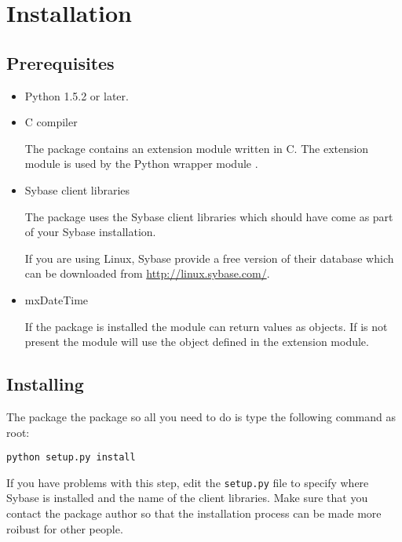 \section{Installation}

\subsection{Prerequisites}

\begin{itemize}
\item Python 1.5.2 or later.

\item C compiler

The  package contains an extension module written in C.
The extension module is used by the Python wrapper module
.

\item Sybase client libraries

The  package uses the Sybase client libraries which
should have come as part of your Sybase installation.

If you are using Linux, Sybase provide a free version of their
database which can be downloaded from \url{http://linux.sybase.com/}.

\item mxDateTime

If the  package is installed the 
module can return  values as  objects.
If  is not present the module will use the
 object defined in the  extension
module.
\end{itemize}
\subsection{Installing}

The  package the  package so all you
need to do is type the following command as root:

\begin{verbatim}
python setup.py install
\end{verbatim}

If you have problems with this step, edit the \texttt{setup.py} file
to specify where Sybase is installed and the name of the client
libraries.  Make sure that you contact the package author so that the
installation process can be made more roibust for other people.

